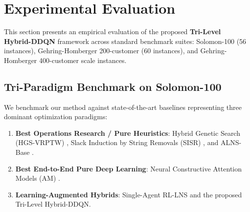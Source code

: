\section{Experimental Evaluation}
\label{sec:experiments}

This section presents an empirical evaluation of the proposed \textbf{Tri-Level Hybrid-DDQN} framework across standard benchmark suites: Solomon-100 (56 instances), Gehring-Homberger 200-customer (60 instances), and Gehring-Homberger 400-customer scale instances.

\subsection{Tri-Paradigm Benchmark on Solomon-100}
\label{sec:solomon_results}

We benchmark our method against state-of-the-art baselines representing three dominant optimization paradigms:
\begin{enumerate}
    \item \textbf{Best Operations Research / Pure Heuristics}: Hybrid Genetic Search (HGS-VRPTW) \cite{vidal2013hybrid}, Slack Induction by String Removals (SISR) \cite{christiaens2020slack}, and ALNS-Base \cite{Ropke2006}.
    \item \textbf{Best End-to-End Pure Deep Learning}: Neural Constructive Attention Models (AM) \cite{kool2019attention,lin2021neural}.
    \item \textbf{Learning-Augmented Hybrids}: Single-Agent RL-LNS \cite{lu2020learning,son2023learning} and the proposed Tri-Level Hybrid-DDQN.
\end{enumerate}

